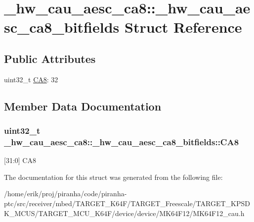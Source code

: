 \hypertarget{struct__hw__cau__aesc__ca8_1_1__hw__cau__aesc__ca8__bitfields}{}\section{\+\_\+hw\+\_\+cau\+\_\+aesc\+\_\+ca8\+:\+:\+\_\+hw\+\_\+cau\+\_\+aesc\+\_\+ca8\+\_\+bitfields Struct Reference}
\label{struct__hw__cau__aesc__ca8_1_1__hw__cau__aesc__ca8__bitfields}
\subsection*{Public Attributes}
\begin{DoxyCompactItemize}
\item 
uint32\+\_\+t \hyperlink{struct__hw__cau__aesc__ca8_1_1__hw__cau__aesc__ca8__bitfields_a8d99176239f903cd165963d8983a5dc2}{C\+A8}\+: 32
\end{DoxyCompactItemize}


\subsection{Member Data Documentation}
\subsubsection[{\texorpdfstring{C\+A8}{CA8}}]{\setlength{\rightskip}{0pt plus 5cm}uint32\+\_\+t \+\_\+hw\+\_\+cau\+\_\+aesc\+\_\+ca8\+::\+\_\+hw\+\_\+cau\+\_\+aesc\+\_\+ca8\+\_\+bitfields\+::\+C\+A8}\hypertarget{struct__hw__cau__aesc__ca8_1_1__hw__cau__aesc__ca8__bitfields_a8d99176239f903cd165963d8983a5dc2}{}\label{struct__hw__cau__aesc__ca8_1_1__hw__cau__aesc__ca8__bitfields_a8d99176239f903cd165963d8983a5dc2}
\mbox{[}31\+:0\mbox{]} C\+A8 

The documentation for this struct was generated from the following file\+:\begin{DoxyCompactItemize}
\item 
/home/erik/proj/piranha/code/piranha-\/ptc/src/receiver/mbed/\+T\+A\+R\+G\+E\+T\+\_\+\+K64\+F/\+T\+A\+R\+G\+E\+T\+\_\+\+Freescale/\+T\+A\+R\+G\+E\+T\+\_\+\+K\+P\+S\+D\+K\+\_\+\+M\+C\+U\+S/\+T\+A\+R\+G\+E\+T\+\_\+\+M\+C\+U\+\_\+\+K64\+F/device/device/\+M\+K64\+F12/M\+K64\+F12\+\_\+cau.\+h\end{DoxyCompactItemize}
